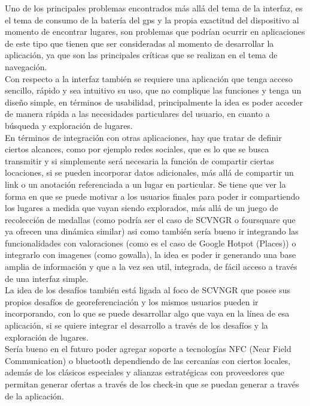 \documentclass[10pt,letterpaper]{article}
\begin{document}
Uno de los principales problemas encontrados más allá del tema de la interfaz, es el tema de consumo de la batería del gps y la propia exactitud del dispositivo al momento de encontrar lugares, son problemas que podrían ocurrir en aplicaciones de este tipo que tienen que ser consideradas al momento de desarrollar la aplicación, ya que son las principales críticas que se realizan en el tema de navegación.\\

Con respecto a la interfaz también se requiere una aplicación que tenga acceso sencillo, rápido y sea intuitivo su uso, que no complique las funciones y tenga un diseño simple, en términos de usabilidad, principalmente la idea es poder acceder de manera rápida a las necesidades particulares del usuario, en cuanto a búsqueda y exploración de lugares.\\

En términos de integración con otras aplicaciones, hay que tratar de definir ciertos alcances, como por ejemplo redes sociales, que es lo que se busca transmitir y si simplemente será necesaria la función de compartir ciertas locaciones, si se pueden incorporar datos adicionales, más allá de compartir un link o un anotación referenciada a un lugar en particular. Se tiene que ver la forma en que se puede motivar a los usuarios finales para poder ir compartiendo los lugares a medida que vayan siendo explorados, más allá de un juego de recolección de medallas (como podría ser el caso de SCVNGR o foursquare que ya ofrecen una dinámica similar) asi como también sería bueno ir integrando las funcionalidades con valoraciones (como es el caso de Google Hotpot (Places)) o integrarlo con imagenes (como gowalla), la idea es poder ir generando una base amplia de información y que a la vez sea util, integrada, de fácil acceso a través de una interfaz simple.\\

La idea de los desafíos también está ligada al foco de SCVNGR que posee sus propios desafíos de georeferenciación y los mismos usuarios pueden ir incorporando, con lo que se puede desarrollar algo que vaya en la línea de esa aplicación, si se quiere integrar el desarrollo a través de los desafíos y la exploración de lugares.\\

Sería bueno en el futuro poder agregar soporte a tecnologías NFC (Near Field Communication) o bluetooth dependiendo de las cercanías con ciertos locales, además de los clásicos especiales y alianzas estratégicas con proveedores que permitan generar ofertas a través de los check-in que se puedan generar a través de la aplicación.\\
\end{document}
